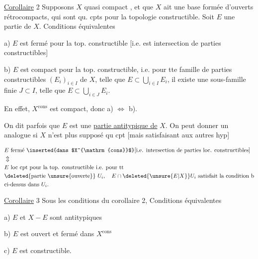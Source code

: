 \uline{Corollaire} 2  Supposons $X$  quasi compact , et que  $X$ ait une base formée d'ouverts  rétrocompacts, qui sont qu. cpts pour la topologie constructible. Soit $E$ une partie de $X$. Conditions équivalentes

a) $E$ est fermé pour la top. constructible [i.e. est intersection  de parties constructibles]

b) $E$ est compact pour la top. constructible, i.e. pour tte famille de parties constructibles $(E_i)_{i\in I}$ de $X$, telle que $E\subset\bigcup_{i\in I}E_i$, il existe une sous-famille finie $J\subset I$, telle que $E\subset\bigcup_{i\in J}E_i$.


 En effet, $X^{\mathrm{cons}}$ est compact, donc a) $\Longleftrightarrow$ b).

On dit parfois  que  $E$ est une \uline{partie antitypique de} $X$. On peut donner un  analogue si $X$ n'est plus supposé qu cpt [mais satisfaisant aux autres hyp]

\[
\begin{aligned}
& E\ \text{fermé \inserted{dans $X^{\mathrm{cons}}$} [i.e. intersection de parties loc. constructibles]}\\
& \Updownarrow\\
& E\ \text{loc cpt pour la top. constructible i.e. pour tt}\\
& \text{\deleted{partie \unsure{ouverte}} }U_i,\quad E\cap \deleted{\unsure{E|X}}U_i\ \text{satisfait la condition b}\\
& \text{ci-dessus dans } U_i .
\end{aligned}
\]

\uline{Corollaire} 3 Sous les conditions du corollaire 2, Conditions équivalentes

a) $E$ et $X-E$ sont antitypiques

b) $E$ est  ouvert et fermé dans $X^{\mathrm{cons}}$

c) $E$ est constructible.
